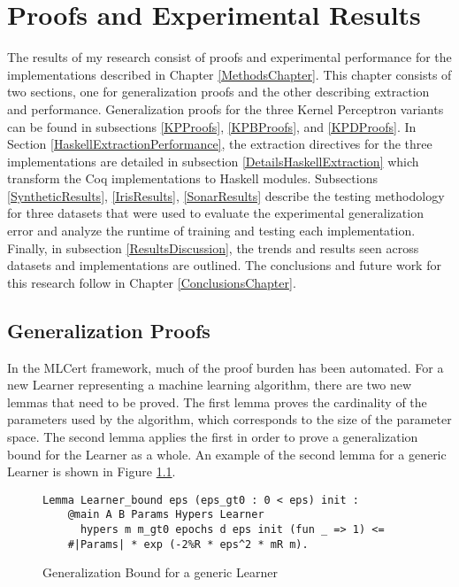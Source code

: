 \chapter{Proofs and Experimental Results}\label{ResultsChapter}
The results of my research consist of proofs and experimental performance for the implementations described in Chapter \ref{MethodsChapter}. This chapter consists of two sections, one for generalization proofs and the other describing extraction and performance. Generalization proofs for the three Kernel Perceptron variants can be found in subsections \ref{KPProofs}, \ref{KPBProofs}, and \ref{KPDProofs}. In Section \ref{HaskellExtractionPerformance}, the extraction directives for the three implementations are detailed in subsection \ref{DetailsHaskellExtraction} which transform the Coq implementations to Haskell modules. Subsections \ref{SyntheticResults}, \ref{IrisResults}, \ref{SonarResults} describe the testing methodology for three datasets that were used to evaluate the experimental generalization error and analyze the runtime of training and testing each implementation. Finally, in subsection \ref{ResultsDiscussion}, the trends and results seen across datasets and implementations are outlined. The conclusions and future work for this research follow in Chapter \ref{ConclusionsChapter}.
\section{Generalization Proofs}\label{Proofs}
In the MLCert framework, much of the proof burden has been automated. For a new Learner representing a machine learning algorithm, there are two new lemmas that need to be proved. The first lemma proves the cardinality of the parameters used by the algorithm, which corresponds to the size of the parameter space. The second lemma applies the first in order to prove a generalization bound for the Learner as a whole. An example of the second lemma for a generic Learner is shown in Figure \ref{LearnerLemma}.

\begin{figure}
    \caption{Generalization Bound for a generic Learner}
    \label{LearnerLemma}
    \begin{lstlisting}
Lemma Learner_bound eps (eps_gt0 : 0 < eps) init : 
    @main A B Params Hypers Learner
      hypers m m_gt0 epochs d eps init (fun _ => 1) <=
    #|Params| * exp (-2%R * eps^2 * mR m).
    \end{lstlisting}
\end{figure}


